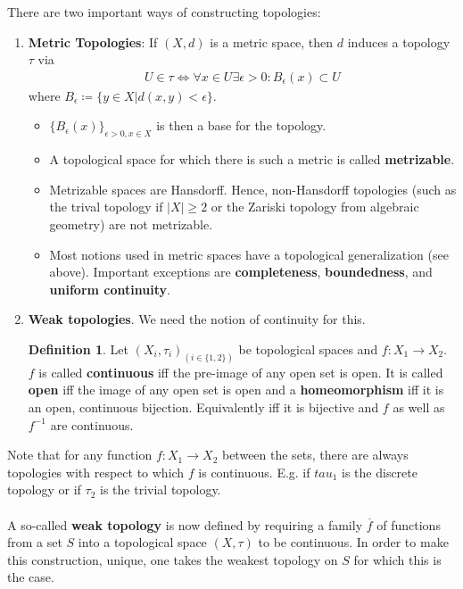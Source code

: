 \documentclass[10pt,a4paper]{article}
\theoremstyle{definition}
\newtheorem{definition}{Definition}
\theoremstyle{cor}
\theoremstyle{theorem}
\theoremstyle{lemma}
\theoremstyle{example}
\theoremstyle{remark}
\begin{document}
\noindent There are two important ways of constructing topologies:
\begin{enumerate}
\item \textbf{Metric Topologies}: If $(X, d)$ is a metric space, then $d$ induces a topology $\tau$ via 
\begin{align*}
U\in \tau \Leftrightarrow \forall x \in U \exists \epsilon > 0 : B_{\epsilon}(x) \subset U
\end{align*}
where $B_{\epsilon} \coloneqq \{y\in X | d(x, y) < \epsilon\}$.
\begin{itemize}
\item $\{B_{\epsilon}(x)\}_{\epsilon > 0, x \in X}$ is then a base for the topology.
\item A topological space for which there is such a metric is called \textbf{metrizable}.
\item Metrizable spaces are Hansdorff. Hence, non-Hansdorff topologies (such as the trival topology if $|X| \geq 2$ or the Zariski topology from algebraic geometry) are not metrizable. 
\item Most notions used in metric  spaces have a topological generalization (see above). Important exceptions are \textbf{completeness}, \textbf{boundedness}, and \textbf{uniform continuity}.
\end{itemize}
\item \textbf{Weak topologies}. We need the notion of continuity for this.
\begin{definition}
Let $(X_i, \tau_i)_{(i \in \{1, 2\})}$ be topological spaces and $f : X_1 \rightarrow X_2$. $f$ is called \textbf{continuous} iff the pre-image of any open set is open. It is called \textbf{open} iff the image of any open set is open and a \textbf{homeomorphism} iff it is an open, continuous bijection. Equivalently iff it is bijective and $f$ as well as $f^{-1}$ are continuous.
\end{definition}
\end{enumerate}
Note that for any function $f:X_1 \rightarrow X_2$ between the sets, there are always topologies with respect to which $f$ is continuous. E.g. if $tau_1$ is the discrete topology or if $\tau_2$ is the trivial topology.
\\ \\
A so-called \textbf{weak topology} is now defined by requiring a family $\overline{f}$ of functions from a set $S$ into a topological space $(X, \tau)$ to be continuous. In order to make this construction, unique, one takes the weakest topology on $S$ for which this is the case.
\end{document}
